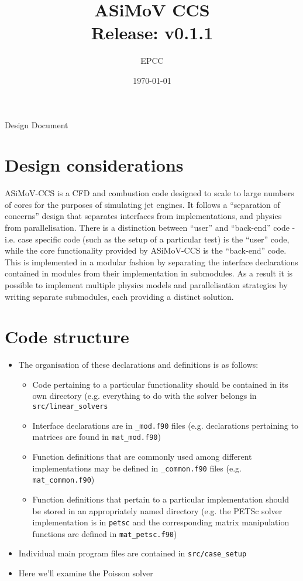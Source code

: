 \documentclass[11pt]{article}
\begin{document}
\lstset{style=codefragment}


\title{ASiMoV CCS\\\small{Release: v0.1.1}}

\date{\today}
\author{EPCC}

\makeEPCCtitle

\centerline{\sc Design Document}

\tableofcontents
\pagebreak

\bigskip


\bigskip

\section{Design considerations}
ASiMoV-CCS is a CFD and combustion code designed to scale to large numbers of cores for the purposes of simulating jet engines. It follows a ``separation of concerns'' design that separates interfaces from implementations, and physics from parallelisation. There is a distinction between ``user'' and ``back-end'' code - i.e. case specific code (such as the setup of a particular test) is the ``user'' code, while the core functionality provided by ASiMoV-CCS is the ``back-end'' code. This is implemented in a modular fashion by separating the interface declarations contained in modules from their implementation in submodules. As a result it is possible to implement multiple physics models and parallelisation strategies by writing separate submodules, each providing a distinct solution.

\section{Code structure}
\begin{itemize}
  \item The organisation of these declarations and definitions is as follows:
  \begin{itemize}
    \item Code pertaining to a particular functionality should be contained in its own directory (e.g. everything to do with the solver belongs in \texttt{src/linear\_solvers}
    \item Interface declarations are in \texttt{\_mod.f90} files (e.g. declarations pertaining to matrices are found in \texttt{mat\_mod.f90})
    \item Function definitions that are commonly used among different implementations may be defined in \texttt{\_common.f90} files (e.g. \texttt{mat\_common.f90})
    \item Function definitions that pertain to a particular implementation should be stored in an appropriately named directory (e.g. the PETSc solver implementation is in \texttt{petsc} and the corresponding matrix manipulation functions are defined in \texttt{mat\_petsc.f90})
  \end{itemize}
  \item Individual main program files are contained in \texttt{src/case\_setup}
  \item Here we'll examine the Poisson solver
\end{itemize}
\end{document}
